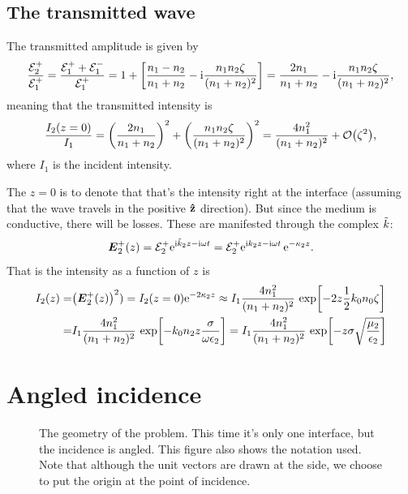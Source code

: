 \documentclass[11pt,letter, swedish, english
]{article}
\begin{document}
\subsection{The transmitted wave}
The transmitted amplitude is given by
\begin{equation}
\frac{{\mathcal{E}_2^+}}{{\mathcal{E}_1^+}} = \frac{{\mathcal{E}_1^+} + {\mathcal{E}_1^-}}{{\mathcal{E}_1^+}} 
= 1 + \qty[\frac{n_1-n_2}{n_1+n_2}
-\mathrm{i}\frac{n_1n_2\zeta}{(n_1+n_2)^2}]
= \frac{2n_1}{n_1+n_2}
-\mathrm{i}\frac{n_1n_2\zeta}{(n_1+n_2)^2},
\end{equation}
meaning that the transmitted intensity is
\begin{equation}
\frac{I_2(z=0)}{I_1} = \qty(\frac{2n_1}{n_1+n_2})^2
+\qty(\frac{n_1n_2\zeta}{(n_1+n_2)^2})^2
= \frac{4n_1^2}{(n_1+n_2)^2} + \order{\zeta^2},
\end{equation}
where $I_1$ is the incident intensity. 

The $z=0$ is to denote that that's the intensity right at the
interface (assuming that the wave travels in the positive $\vu{z}$
direction). But since the medium is conductive, there will be
losses. These are manifested through the complex $\tilde{k}$:
\begin{equation}
\vb*E_2^+(z) = {\mathcal{E}_2^+} \mathrm{e}^{\mathrm{i}\tilde{k}_2 z - \mathrm{i}\omega t}
={\mathcal{E}_2^+} \mathrm{e}^{\mathrm{i} k_2z - \mathrm{i}\omega t}\,\mathrm{e}^{-\kappa_2z}.
\end{equation}
That is the intensity as a function of $z$ is
\begin{equation}
\begin{aligned}
I_2(z)=&\qty(\vb*E_2^+(z))^2)=I_2(z=0)\mathrm{e}^{-2\kappa_2z}
\approx I_1 \frac{4n_1^2}{(n_1+n_2)^2}\,\exp[-2z\frac{1}{2}k_0n_0\zeta]\\
=&I_1 \frac{4n_1^2}{(n_1+n_2)^2}\,
\exp[-k_0n_2z\frac{\sigma}{\omega\epsilon_2}]
=I_1 \frac{4n_1^2}{(n_1+n_2)^2}\,
\exp[-z\sigma\sqrt{\frac{\mu_2}{\epsilon_2}}]
\end{aligned}
\end{equation}





\section{Angled incidence}
\newcommand{\kp}{\vb*{k}_1^+}
\newcommand{\km}{\vb*{k}_1^-}
\newcommand{\kpp}{\vb*{k}_2^+}

\begin{figure}
\centering
\resizebox{.45\textwidth}{!}{}
\caption{The geometry of the problem. This time it's only one
  interface, but the incidence is angled. This figure also shows the
  notation used. Note that although the unit vectors are drawn at the
  side, we choose to put the origin at the point of incidence. }
\label{fig:3_geometry}
\end{figure}
\end{document}
